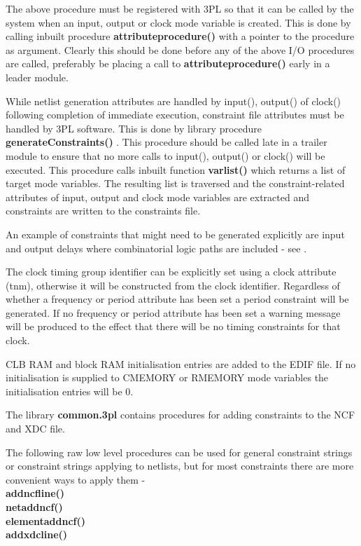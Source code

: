     The above procedure must be registered with 3PL so that it can be called by
    the system when an input, output or clock mode variable is created. This is
    done by calling inbuilt procedure {\bf attributeprocedure()}
     with a pointer to the procedure as
    argument. Clearly this should be done before any of the above I/O procedures
    are called, preferably be placing a call to {\bf attributeprocedure()} early
    in a leader module.

    While netlist generation attributes are handled by input(), output() of
    clock() following completion of immediate execution, constraint file
    attributes must be handled by 3PL software. This is done by library procedure
    {\bf generateConstraints()} . This
    procedure should be called late in a trailer module to ensure that no more
    calls to input(), output() or clock() will be executed. This procedure calls
    inbuilt function {\bf varlist()}  which returns a
    list of target mode variables. The resulting list is traversed and the
    constraint-related attributes of input, output and clock mode variables are
    extracted and constraints are written to the constraints file.   
    
    An example of constraints that might need to be generated explicitly are
    input and output delays where combinatorial logic paths are included - see
    .
    
    The clock timing group identifier can be explicitly set using a clock
    attribute (tnm), otherwise it will be constructed from the
    clock identifier. Regardless of whether a frequency or period attribute
    has been set a period constraint will be generated. If no frequency
    or period attribute has been set a warning message will be produced to
    the effect that there will be no timing constraints for that clock.
    
    CLB RAM and block RAM initialisation entries are added to the
    EDIF file. If no initialisation is supplied to CMEMORY or RMEMORY
    mode variables the initialisation entries will be 0.

    The library {\bf common.3pl} contains procedures for adding constraints to the
    NCF and XDC file.

    The following raw low level procedures can be used for general constraint strings
    or constraint strings applying to netlists, but for most constraints there are
    more convenient ways to apply them - \\
    {\bf addncfline()}  \\
    {\bf netaddncf()}  \\
    {\bf elementaddncf()}  \\
    {\bf addxdcline()} 
    

